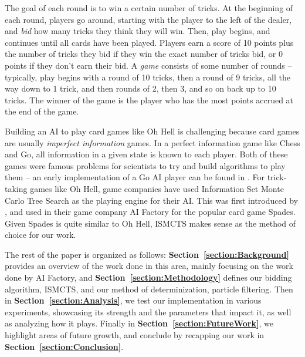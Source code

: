 \documentclass{article}
\begin{document}
The goal of each round is to win a certain number of tricks. At the beginning of each round, players go around, starting with the player to the left of the dealer, and \textit{bid} how many tricks they think they will win.
Then, play begins, and continues until all cards have been played. Players earn a score of 10 points plus the number of tricks they bid if they win the exact number of tricks bid, or 0 points if they don't earn their bid.
A \textit{game} consists of some number of rounds -- typically, play begins with a round of 10 tricks, then a round of 9 tricks, all the way down to 1 trick, and then rounds of 2, then 3, and so on back up to 10 tricks. 
The winner of the game is the player who has the most points accrued at the end of the game.

Building an AI to play card games like Oh Hell is challenging because card games are usually \textit{imperfect information} games. 
In a perfect information game like Chess and Go, all information in a given state is known to each player. Both of these games were famous problems for scientists to try and build algorithms to play them -- an early implementation of a Go AI player can be found in \citet{van2004ai}.
For trick-taking games like Oh Hell, game companies have used Information Set Monte Carlo Tree Search as the playing engine for their AI. This was first introduced by \citet{cowling2012information}, and used in their game company AI Factory for the popular card game Spades. Given Spades is quite similar to Oh Hell, ISMCTS makes sense as the method of choice for our work.

The rest of the paper is organized as follows: \textbf{Section~\ref{section:Background}} provides an overview of the work done in this area, mainly focusing on the work done by AI Factory, and \textbf{Section~\ref{section:Methodology}} defines our bidding algorithm, ISMCTS, and our method of determinization, particle filtering. 
Then in \textbf{Section~\ref{section:Analysis}}, we test our implementation in various experiments, showcasing its strength and the parameters that impact it, as well as analyzing how it plays. 
Finally in \textbf{Section~\ref{section:FutureWork}}, we highlight areas of future growth, and conclude by recapping our work in \textbf{Section~\ref{section:Conclusion}}.
 
\end{document}
